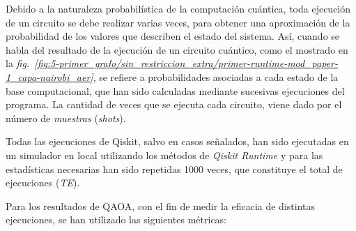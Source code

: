Debido a la naturaleza probabilística de la computación cuántica, toda ejecución de un circuito se debe realizar varias veces, para obtener una aproximación de la probabilidad de los valores que describen el estado del sistema.
Así, cuando se habla del resultado de la ejecución de un circuito cuántico, como el mostrado en la \textit{fig.~\ref{fig:5-primer_grafo/sin_restriccion_extra/primer-runtime-mod_paper-1_capa-nairobi_aer}},
se refiere a probabilidades asociadas a cada estado de la base computacional, que han sido calculadas mediante sucesivas ejecuciones del programa.
La cantidad de veces que se ejecuta cada circuito, viene dado por el número de \textit{muestras} (\textit{shots}).

Todas las ejecuciones de Qiskit, salvo en casos señalados, han sido ejecutadas en un simulador en local utilizando los métodos de \textit{Qiskit Runtime} y para las estadísticas necesarias han sido repetidas 1000 veces, que constituye el total de ejecuciones (\textit{TE}).

Para los resultados de QAOA, con el fin de medir la eficacia de distintas ejecuciones, se han utilizado las siguientes métricas:

